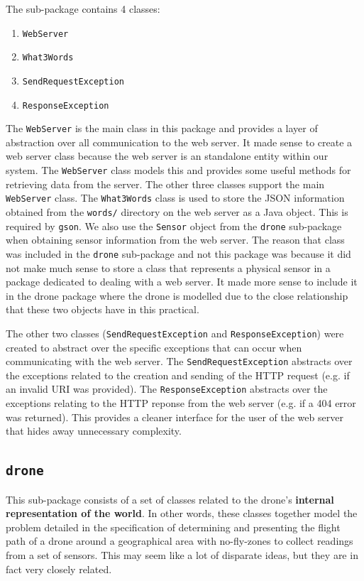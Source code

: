 \documentclass[11pt]{article}
\begin{document}
The sub-package contains 4 classes:
\begin{enumerate}[topsep=0pt, itemsep=0pt]
    \item \texttt{WebServer}
    \item \texttt{What3Words}
    \item \texttt{SendRequestException}
    \item \texttt{ResponseException}
\end{enumerate}

The \texttt{WebServer} is the main class in this package and provides a layer of abstraction over all communication to the web server. It made sense to create a web server class because the web server is an standalone entity within our system. The \texttt{WebServer} class models this and provides some useful methods for retrieving data from the server. The other three classes support the main \texttt{WebServer} class. The \texttt{What3Words} class is used to store the JSON information obtained from the \texttt{words/} directory on the web server as a Java object. This is required by \texttt{gson}. We also use the \texttt{Sensor} object from the \texttt{drone} sub-package when obtaining sensor information from the web server. The reason that class was included in the \texttt{drone} sub-package and not this package was because it did not make much sense to store a class that represents a physical sensor in a package dedicated to dealing with a web server. It made more sense to include it in the drone package where the drone is modelled due to the close relationship that these two objects have in this practical.

The other two classes (\texttt{SendRequestException} and \texttt{ResponseException}) were created to abstract over the specific exceptions that can occur when communicating with the web server. The \texttt{SendRequestException} abstracts over the exceptions related to the creation and sending of the HTTP request (e.g. if an invalid URI was provided). The \texttt{ResponseException} abstracts over the exceptions relating to the HTTP reponse from the web server (e.g. if a 404 error was returned). This provides a cleaner interface for the user of the web server that hides away unnecessary complexity.

\subsection{\texttt{drone}}
This sub-package consists of a set of classes related to the drone's \textbf{internal representation of the world}. In other words, these classes together model the problem detailed in the specification of determining and presenting the flight path of a drone around a geographical area with no-fly-zones to collect readings from a set of sensors. This may seem like a lot                                of disparate ideas, but they are in fact very closely related.
\end{document}
